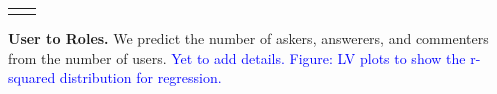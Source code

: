 \begin{table}[h!]
\begin{tabular}{m{}c}
\begin{minipage}{.17\textwidth}
    \end{minipage}
    \\
  \end{tabular}
  \vspace{-\baselineskip}
  \label{tab:interaction}
\end{table}

\textbf{User to Roles.} 
We predict the number of askers, answerers, and commenters from the number of users. \textcolor{blue}{Yet to add details. Figure: LV plots to show the r-squared distribution for regression.}




